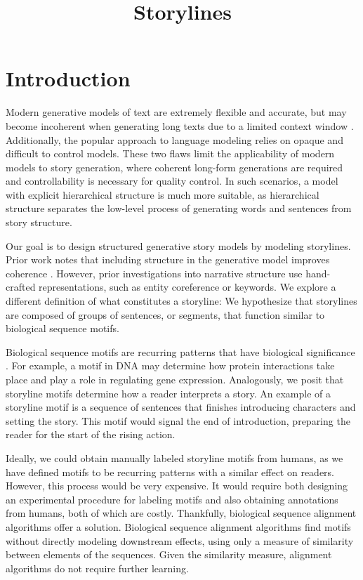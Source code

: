\documentclass{article}
\title{Storylines}
\begin{document}
\maketitle

\section{Introduction}
Modern generative models of text are extremely flexible and accurate,
but may become incoherent when generating long texts due to a limited context window
\citep{brown2020language,rakshin2020plotmachines}.
Additionally, the popular approach to language modeling relies on opaque
and difficult to control models.
These two flaws limit the applicability of modern models to story generation,
where coherent long-form generations are required
and controllability is necessary for quality control.
In such scenarios, a model with explicit hierarchical structure is much more suitable,
as hierarchical structure separates the low-level process of generating 
words and sentences from story structure.

Our goal is to design structured generative story models by modeling storylines.
Prior work notes that including structure in the generative model improves coherence
\citep{yao2018storyline,fan2019structure,ippolito2019rarewords,chandu2020narrative}.
However, prior investigations into narrative structure use hand-crafted representations,
such as entity coreference or keywords.
We explore a different definition of what constitutes a storyline:
We hypothesize that storylines are composed of groups of sentences, or segments, that function
similar to biological sequence motifs.

Biological sequence motifs are recurring patterns that have
biological significance \citep{biomotif}.
For example, a motif in DNA may determine how protein interactions take place
and play a role in regulating gene expression.
Analogously, we posit that storyline motifs determine how a reader interprets a story.
An example of a storyline motif is a sequence of sentences that finishes 
introducing characters and setting the story.
This motif would signal the end of introduction, preparing the reader for 
the start of the rising action.

Ideally, we could obtain manually labeled storyline motifs from humans,
as we have defined motifs to be recurring patterns with a similar effect on readers.
However, this process would be very expensive.
It would require both designing an experimental procedure for labeling motifs
and also obtaining annotations from humans, both of which are costly.
Thankfully, biological sequence alignment algorithms offer a solution.
Biological sequence alignment algorithms find motifs without directly modeling
downstream effects, using only a measure of similarity between elements of the sequences.
Given the similarity measure, alignment algorithms do not require further learning.
\end{document}
